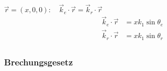 $ \vec{r} = (x,0,0): \quad \vec{k}_e \cdot \vec{r} = \vec{k}_r \cdot \vec{r} $
\begin{align*}
\vec{k}_e \cdot \vec{r} &= x k_1 \sin \theta_e\\
\vec{k}_r \cdot \vec{r} &= x k_1 \sin \theta_r\\
\end{align*}
\begin{center}
	\begin{minipage}{.5\linewidth}
	\end{minipage}
\end{center}


\subsubsection{Brechungsgesetz}

